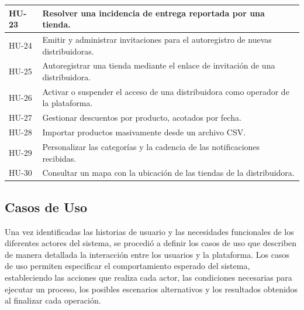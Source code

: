 \documentclass[12pt,a4paper]{report}
\begin{document}
\begin{longtable}{|p{2cm}|p{12cm}|}
HU-23 & Resolver una incidencia de entrega reportada por una tienda. \\ \hline
HU-24 & Emitir y administrar invitaciones para el autoregistro de nuevas distribuidoras. \\ \hline
HU-25 & Autoregistrar una tienda mediante el enlace de invitación de una distribuidora. \\ \hline
HU-26 & Activar o suspender el acceso de una distribuidora como operador de la plataforma. \\ \hline
HU-27 & Gestionar descuentos por producto, acotados por fecha. \\ \hline
HU-28 & Importar productos masivamente desde un archivo CSV. \\ \hline
HU-29 & Personalizar las categorías y la cadencia de las notificaciones recibidas. \\ \hline
HU-30 & Consultar un mapa con la ubicación de las tiendas de la distribuidora. \\ \hline
\end{longtable}

\subsection{Casos de Uso }
Una vez identificadas las historias de usuario y las necesidades funcionales de los diferentes actores del sistema, se procedió a definir los casos de uso que describen de manera detallada la interacción entre los usuarios y la plataforma. Los casos de uso permiten especificar el comportamiento esperado del sistema, estableciendo las acciones que realiza cada actor, las condiciones necesarias para ejecutar un proceso, los posibles escenarios alternativos y los resultados obtenidos al finalizar cada operación.
\end{document}
